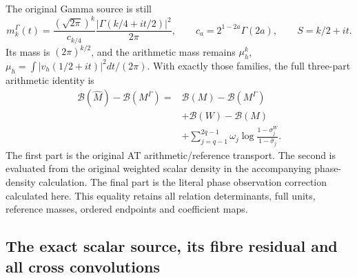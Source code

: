 The original Gamma source is still
\[
 m_k^\Gamma(t)=\frac{(\sqrt{2\pi})^k}{c_{k/4}}
                 \frac{|\Gamma(k/4+it/2)|^2}{2\pi},\qquad
 c_a=2^{1-2a}\Gamma(2a),\qquad S=k/2+it.
\tag{PGS.33}\label{eq:pgs-reference}
\]
Its mass is \((2\pi)^{k/2}\), and the arithmetic mass remains
\(\mu_h^k\), \(\mu_h=\int |v_h(1/2+it)|^2dt/(2\pi)\).
With exactly those families, the full three-part arithmetic identity is
\[
\begin{aligned}
 \mathcal B(\widehat M)-\mathcal B(M^\Gamma)
  ={}&\mathcal B(M)-\mathcal B(M^\Gamma)\\
    &+\mathcal B(W)-\mathcal B(M)\\
    &+\sum_{j=q-1}^{2q-1}\omega_j
             \log\frac{1-\sigma_j^W}{1-\widehat\sigma_j}.
\end{aligned}
\tag{PGS.34}\label{eq:pgs-three-part}
\]
The first part is the original AT arithmetic/reference transport.
The second is evaluated from the original weighted scalar density in
the accompanying phase-density calculation. The final part is the
literal phase observation correction calculated here. This equality
retains all relation determinants, full units, reference masses,
ordered endpoints and coefficient maps.

\subsection{The exact scalar source, its fibre residual and all cross convolutions}

